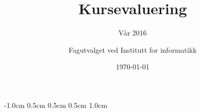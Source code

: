 \documentclass[norsk,a4paper,11pt]{report}
\author{Fagutvalget ved Institutt for informatikk}
\title{Kursevaluering}
\subtitle{Vår 2016}
\date{\today}
\begin{document}
\ififorside{}

\setlength{\topmargin}		{-1.0cm}
\setlength{\headsep}		{0.5cm}
\setlength{\oddsidemargin}	{0.5cm}
\setlength{\evensidemargin}	{0.5cm}
\setlength{\footskip}		{1.0cm}

%

%
\end{document}
